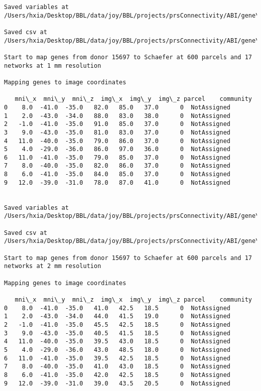 \documentclass[11pt]{article}
\begin{document}
\begin{Verbatim}[commandchars=\\\{\}]
Saved variables at /Users/hxia/Desktop/BBL/data/joy/BBL/projects/prsConnectivity/ABI/gene\_mapping/15697donor\_600Parcels\_7Network\_2mm.pkl

Saved csv at /Users/hxia/Desktop/BBL/data/joy/BBL/projects/prsConnectivity/ABI/gene\_mapping/15697donor\_600Parcels\_7Network\_2mm.csv

Start to map genes from donor 15697 to Schaefer at 600 parcels and 17 networks at 1 mm resolution

Mapping genes to image coordinates

   mni\_x  mni\_y  mni\_z  img\_x  img\_y  img\_z parcel    community
0    8.0  -41.0  -35.0   82.0   85.0   37.0      0  NotAssigned
1    2.0  -43.0  -34.0   88.0   83.0   38.0      0  NotAssigned
2   -1.0  -41.0  -35.0   91.0   85.0   37.0      0  NotAssigned
3    9.0  -43.0  -35.0   81.0   83.0   37.0      0  NotAssigned
4   11.0  -40.0  -35.0   79.0   86.0   37.0      0  NotAssigned
5    4.0  -29.0  -36.0   86.0   97.0   36.0      0  NotAssigned
6   11.0  -41.0  -35.0   79.0   85.0   37.0      0  NotAssigned
7    8.0  -40.0  -35.0   82.0   86.0   37.0      0  NotAssigned
8    6.0  -41.0  -35.0   84.0   85.0   37.0      0  NotAssigned
9   12.0  -39.0  -31.0   78.0   87.0   41.0      0  NotAssigned


Saved variables at /Users/hxia/Desktop/BBL/data/joy/BBL/projects/prsConnectivity/ABI/gene\_mapping/15697donor\_600Parcels\_17Network\_1mm.pkl

Saved csv at /Users/hxia/Desktop/BBL/data/joy/BBL/projects/prsConnectivity/ABI/gene\_mapping/15697donor\_600Parcels\_17Network\_1mm.csv

Start to map genes from donor 15697 to Schaefer at 600 parcels and 17 networks at 2 mm resolution

Mapping genes to image coordinates

   mni\_x  mni\_y  mni\_z  img\_x  img\_y  img\_z parcel    community
0    8.0  -41.0  -35.0   41.0   42.5   18.5      0  NotAssigned
1    2.0  -43.0  -34.0   44.0   41.5   19.0      0  NotAssigned
2   -1.0  -41.0  -35.0   45.5   42.5   18.5      0  NotAssigned
3    9.0  -43.0  -35.0   40.5   41.5   18.5      0  NotAssigned
4   11.0  -40.0  -35.0   39.5   43.0   18.5      0  NotAssigned
5    4.0  -29.0  -36.0   43.0   48.5   18.0      0  NotAssigned
6   11.0  -41.0  -35.0   39.5   42.5   18.5      0  NotAssigned
7    8.0  -40.0  -35.0   41.0   43.0   18.5      0  NotAssigned
8    6.0  -41.0  -35.0   42.0   42.5   18.5      0  NotAssigned
9   12.0  -39.0  -31.0   39.0   43.5   20.5      0  NotAssigned



\end{Verbatim}
\end{document}
